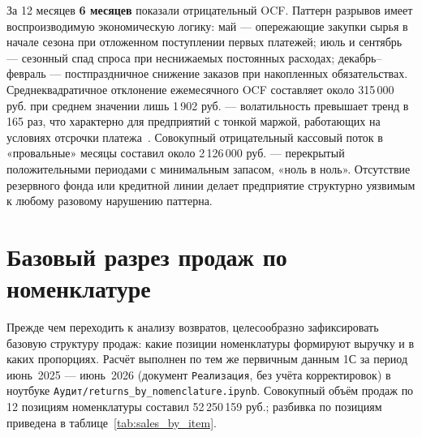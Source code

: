 За 12 месяцев \textbf{6 месяцев} показали отрицательный OCF. Паттерн разрывов имеет воспроизводимую экономическую логику: май --- опережающие закупки сырья в начале сезона при отложенном поступлении первых платежей; июль и сентябрь --- сезонный спад спроса при неснижаемых постоянных расходах; декабрь--февраль --- постпраздничное снижение заказов при накопленных обязательствах. Среднеквадратичное отклонение ежемесячного OCF составляет около 315\,000 руб. при среднем значении лишь 1\,902 руб. --- волатильность превышает тренд в 165 раз, что характерно для предприятий с тонкой маржой, работающих на условиях отсрочки платежа~\cite{sme_profitability_ru}. Совокупный отрицательный кассовый поток в «провальные» месяцы составил около 2\,126\,000 руб. --- перекрытый положительными периодами с минимальным запасом, «ноль в ноль». Отсутствие резервного фонда или кредитной линии делает предприятие структурно уязвимым к любому разовому нарушению паттерна.

\section{Базовый разрез продаж по номенклатуре}
\label{sec:sales_by_item}

Прежде чем переходить к анализу возвратов, целесообразно зафиксировать базовую структуру продаж: какие позиции номенклатуры формируют выручку и в каких пропорциях. Расчёт выполнен по тем же первичным данным 1С за период июнь~2025 --- июнь~2026 (документ \texttt{Реализация}, без учёта корректировок) в ноутбуке \texttt{Аудит/returns\_by\_nomenclature.ipynb}. Совокупный объём продаж по 12 позициям номенклатуры составил 52\,250\,159 руб.; разбивка по позициям приведена в таблице~\ref{tab:sales_by_item}.

